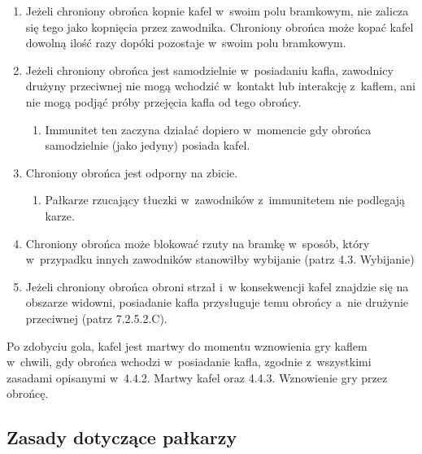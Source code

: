 \documentclass[12pt,a4paper]{article}
\renewcommand{\paragraph}[1]{
  \oldparagraph{#1}%
  \leftskip2cm
}
\begin{document}
\begin{enumerate}
	\item
	      Jeżeli chroniony obrońca kopnie kafel w~swoim polu bramkowym, nie
	      zalicza się tego jako kopnięcia przez zawodnika. Chroniony obrońca
	      może kopać kafel dowolną ilość razy dopóki pozostaje w~swoim polu
	      bramkowym.
	\item
	      Jeżeli chroniony obrońca jest samodzielnie w~posiadaniu kafla,
	      zawodnicy drużyny przeciwnej nie mogą wchodzić w~kontakt lub
	      interakcję z~kaflem, ani nie mogą podjąć próby przejęcia kafla od tego
	      obrońcy.

	      \begin{enumerate}
		      \item
		            Immunitet ten zaczyna działać dopiero w~momencie gdy obrońca
		            samodzielnie (jako jedyny) posiada kafel.
	      \end{enumerate}
	\item
	      Chroniony obrońca jest odporny na zbicie.

	      \begin{enumerate}
		      \item
		            Pałkarze rzucający tłuczki w~zawodników z~immunitetem nie podlegają
		            karze.
	      \end{enumerate}
	\item
	      Chroniony obrońca może blokować rzuty na bramkę w~sposób, który w~przypadku innych zawodników stanowiłby wybijanie (patrz 4.3.
	      Wybijanie)
	\item
	      Jeżeli chroniony obrońca obroni strzał i~w konsekwencji kafel znajdzie
	      się na obszarze widowni, posiadanie kafla przysługuje temu obrońcy a~nie drużynie przeciwnej (patrz 7.2.5.2.C).
\end{enumerate}

\paragraph{Wznowienie gry przez obrońcę}
Po zdobyciu gola, kafel
jest martwy do momentu wznowienia gry kaflem w~chwili, gdy obrońca
wchodzi w~posiadanie kafla, zgodnie z~wszystkimi zasadami opisanymi w~4.4.2. Martwy kafel oraz 4.4.3. Wznowienie gry przez obrońcę.

\subsection{Zasady dotyczące pałkarzy}
\end{document}
